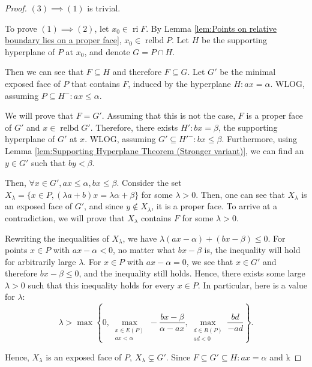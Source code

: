 \begin{proof}
  \( (3) \implies (1) \) is trivial.

  To prove \( (1) \implies (2) \), let \( x_{0} \in \operatorname{ri} F \). By
  Lemma \ref{lem:Points on relative boundary lies on a proper face}, \( x_{0} \in
  \operatorname{relbd} P \). Let \( H \) be the supporting hyperplane of \( P \)
  at \( x_{0} \), and denote \( G = P \cap H \).

  Then we can see that \( F \subseteq H \) and therefore \( F \subseteq G \).
  Let \( G' \) be the minimal exposed face of \( P \) that contains \( F \),
  induced by the hyperplane \( H: ax = \alpha \). WLOG, assuming \( 
  P\subseteq H^{-}: ax \le  \alpha \).

  We will prove that \( F = G' \). Assuming that this
  is not the case, \( F \) is a proper face of \( G' \) and \( x \in
  \operatorname{relbd} G' \). Therefore, there exists \( H': bx = \beta \),
  the supporting hyperplane of \( G' \) at \( x \). WLOG, assuming \( G'
  \subseteq H'^{-}: bx \le \beta \). Furthermore, using Lemma
  \ref{lem:Supporting Hyperplane Theorem (Stronger variant)}, we can find an \(
  y \in G'\) such that \( by < \beta \).

  Then, \( \forall x \in G', ax \le \alpha, bx \le \beta \). Consider the set \(
  X_{\lambda} = \{x \in P, (\lambda a + b)x = \lambda \alpha + \beta\}  \) for
  some \(  \lambda > 0 \). Then, one can see that \( X_{\lambda} \) is an
  exposed face of \( G' \), and since \( y \notin X_{\lambda} \), it is a proper
  face. To arrive at a contradiction, we will prove that \( X_{\lambda} \)
  contains \( F \) for some \( \lambda > 0 \).

  Rewriting the inequalities of \( X_{\lambda} \), we have \( \lambda(ax
  -\alpha) + (bx - \beta) \le  0 \). For points \( x \in P \) with \( ax -
  \alpha < 0
  \), no matter what \( bx - \beta \) is, the inequality will hold for
  arbitrarily large \( \lambda \). For \( x \in P \) with \( ax - \alpha =0 \),
  we see that \( x \in G' \) and therefore \( bx - \beta \le  0 \), and the
  inequality still holds. Hence, there exists some large \( \lambda > 0 \) such
  that this inequality holds for every \( x \in P \). In particular, here is a
  value for \( \lambda \):
  \[
    \lambda > \max \left\{ 0, \max_{\substack{x\in E(P)\\ax<\alpha}} -\frac{bx
    - \beta}{\alpha - ax}, \max_{\substack{d \in R(P)\\ ad < 0}}  \frac{bd}{-ad}\right\}
  .\] 

  Hence, \( X_{\lambda} \) is an exposed face of \( P \), \( X_{\lambda}
  \subsetneq G' \). Since \( F \subseteq G' \subseteq H: ax = \alpha \) and k

\end{proof}


